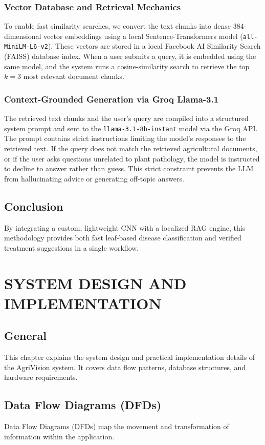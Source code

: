 \documentclass[12pt, a4paper]{report}
\begin{document}
\subsection{Vector Database and Retrieval Mechanics}
To enable fast similarity searches, we convert the text chunks into dense 384-dimensional vector embeddings using a local Sentence-Transformers model (\texttt{all-MiniLM-L6-v2}). These vectors are stored in a local Facebook AI Similarity Search (FAISS) database index. When a user submits a query, it is embedded using the same model, and the system runs a cosine-similarity search to retrieve the top $k = 3$ most relevant document chunks.

\subsection{Context-Grounded Generation via Groq Llama-3.1}
The retrieved text chunks and the user's query are compiled into a structured system prompt and sent to the \texttt{llama-3.1-8b-instant} model via the Groq API. The prompt contains strict instructions limiting the model's responses to the retrieved text. If the query does not match the retrieved agricultural documents, or if the user asks questions unrelated to plant pathology, the model is instructed to decline to answer rather than guess. This strict constraint prevents the LLM from hallucinating advice or generating off-topic answers.

\section{Conclusion}
By integrating a custom, lightweight CNN with a localized RAG engine, this methodology provides both fast leaf-based disease classification and verified treatment suggestions in a single workflow.

\chapter{SYSTEM DESIGN AND IMPLEMENTATION}

\section{General}
This chapter explains the system design and practical implementation details of the AgriVision system. It covers data flow patterns, database structures, and hardware requirements.

\section{Data Flow Diagrams (DFDs)}
Data Flow Diagrams (DFDs) map the movement and transformation of information within the application.
\end{document}
